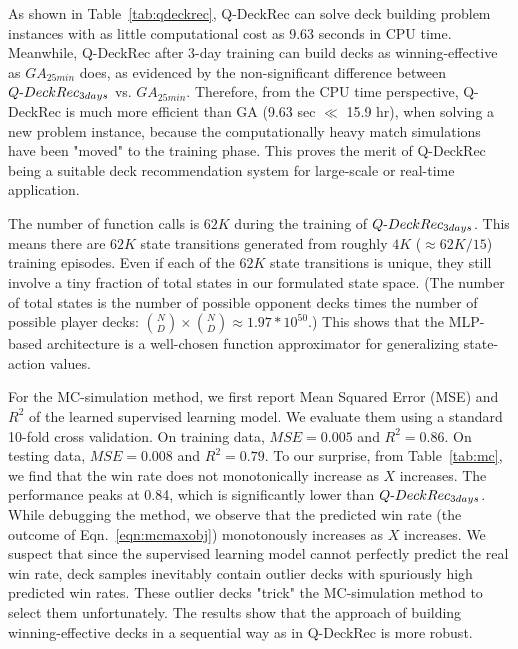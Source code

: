 
As shown in Table~\ref{tab:qdeckrec}, Q-DeckRec can solve deck building problem instances with as little computational cost as 9.63 seconds in CPU time. Meanwhile, Q-DeckRec after 3-day training can build decks as winning-effective as $GA_{25min}$ does, as evidenced by the non-significant difference between $Q\textnormal{-}DeckRec_{ 3days}$ vs. $GA_{25min}$. Therefore, from the CPU time perspective, Q-DeckRec is much more efficient than GA ({9.63 sec $\ll$ 15.9 hr}), when solving a new problem instance, because the computationally heavy match simulations have been "moved" to the training phase. This proves the merit of Q-DeckRec being a suitable deck recommendation system for large-scale or real-time application. 

The number of function calls is $62K$ during the training of $Q\textnormal{-}DeckRec_{3days}$. This means there are $62K$ state transitions generated from roughly $4K$ ($\approx 62K/15$) training episodes. Even if each of the $62K$ state transitions is unique, they still involve a tiny fraction of total states in our formulated state space. (The number of total states is the number of possible opponent decks times the number of possible player decks: ${N\choose D} \times {N\choose D} \approx 1.97 * 10^{50}$.) This shows that the MLP-based architecture is a well-chosen function approximator for generalizing state-action values.    


For the MC-simulation method, we first report Mean Squared Error (MSE) and $R^2$ of the learned supervised learning model. We evaluate them using a standard 10-fold cross validation. On training data, $MSE=0.005$ and $R^2=0.86$. On testing data, $MSE=0.008$ and $R^2=0.79$. To our surprise, from Table~\ref{tab:mc}, we find that the win rate does not monotonically increase as $X$ increases. The performance peaks at 0.84, which is significantly lower than $Q\textnormal{-}DeckRec_{3days}$. While debugging the method, we observe that the predicted win rate (the outcome of Eqn.~\ref{eqn:mcmaxobj}) monotonously increases as $X$ increases. We suspect that since the supervised learning model cannot perfectly predict the real win rate, deck samples inevitably contain outlier decks with spuriously high predicted win rates. These outlier decks "trick" the MC-simulation method to select them unfortunately. The results show that the approach of building winning-effective decks in a sequential way as in Q-DeckRec is more robust.


